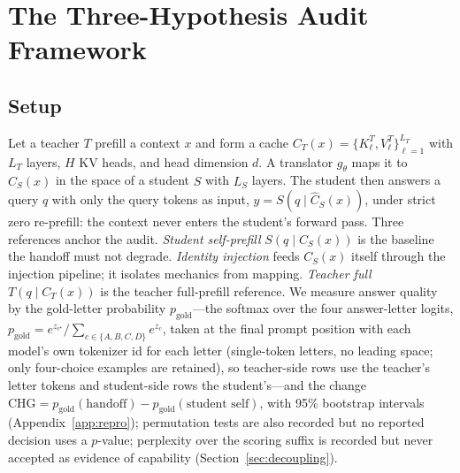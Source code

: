 \documentclass[10pt]{article}
\newcommand{\chg}{\mathrm{CHG}}
\newcommand{\gold}{p_{\mathrm{gold}}}
\begin{document}
\section{The Three-Hypothesis Audit Framework}
\label{sec:framework}

\subsection{Setup}
Let a teacher $T$ prefill a context $x$ and form a cache
$C_T(x) = \{K^T_\ell, V^T_\ell\}_{\ell=1}^{L_T}$ with $L_T$ layers, $H$ KV
heads, and head dimension $d$. A translator $g_\theta$ maps it to
$\widehat{C}_S(x)$ in the space of a student $S$ with $L_S$ layers. The
student then answers a query $q$ with only the query tokens as input,
$\hat{y} = S(q \mid \widehat{C}_S(x))$, under strict zero re-prefill: the
context never enters the student's forward pass. Three references anchor the
audit. \emph{Student self-prefill} $S(q \mid C_S(x))$ is the baseline the
handoff must not degrade. \emph{Identity injection} feeds $C_S(x)$ itself
through the injection pipeline; it isolates mechanics from mapping.
\emph{Teacher full} $T(q \mid C_T(x))$ is the teacher full-prefill reference. We
measure answer quality by the gold-letter probability $\gold$---the softmax over
the four answer-letter logits,
$\gold = e^{z_{c^\star}}/\sum_{c \in \{A,B,C,D\}} e^{z_c}$, taken at the final
prompt position with each model's own tokenizer id for each letter (single-token
letters, no leading space; only four-choice examples are retained), so teacher-side rows use the teacher's letter tokens
and student-side rows the student's---and the change
$\chg = \gold(\text{handoff}) - \gold(\text{student self})$, with
95\% bootstrap intervals (Appendix~\ref{app:repro}); permutation tests are also
recorded but no reported decision uses a $p$-value; perplexity over the
scoring suffix is recorded but never accepted as evidence of capability
(Section~\ref{sec:decoupling}).
\end{document}
